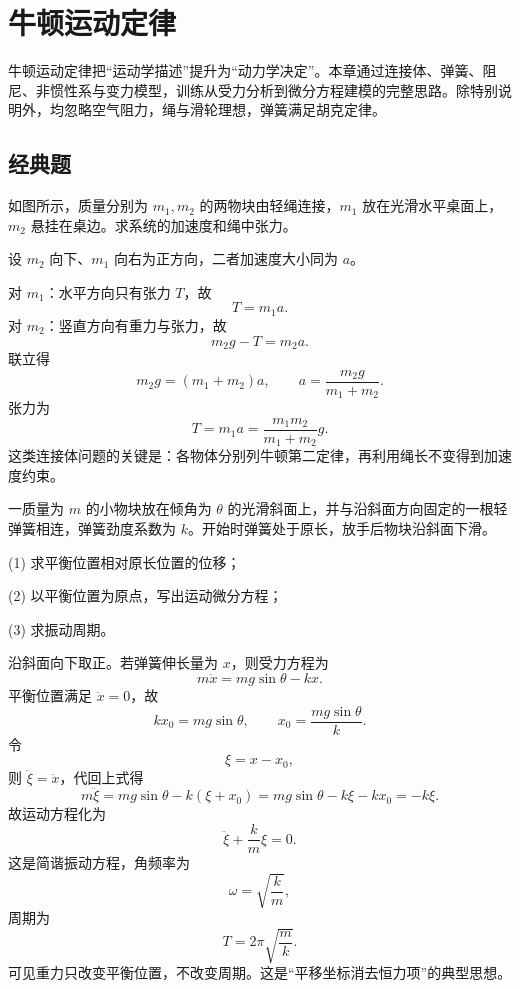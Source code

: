 \chapter{牛顿运动定律}

牛顿运动定律把“运动学描述”提升为“动力学决定”。本章通过连接体、弹簧、阻尼、非惯性系与变力模型，训练从受力分析到微分方程建模的完整思路。除特别说明外，均忽略空气阻力，绳与滑轮理想，弹簧满足胡克定律。

\section*{经典题}

\begin{classic}
如图所示，质量分别为 $m_1,m_2$ 的两物块由轻绳连接，$m_1$ 放在光滑水平桌面上，$m_2$ 悬挂在桌边。求系统的加速度和绳中张力。

\begin{center}
\end{center}

\begin{solution}
设 $m_2$ 向下、$m_1$ 向右为正方向，二者加速度大小同为 $a$。

对 $m_1$：水平方向只有张力 $T$，故
\[
T=m_1 a.
\]
对 $m_2$：竖直方向有重力与张力，故
\[
m_2 g-T=m_2 a.
\]
联立得
\[
m_2 g=(m_1+m_2)a,
\qquad
a=\frac{m_2 g}{m_1+m_2}.
\]
张力为
\[
T=m_1 a=\frac{m_1m_2}{m_1+m_2}g.
\]
这类连接体问题的关键是：各物体分别列牛顿第二定律，再利用绳长不变得到加速度约束。
\end{solution}
\end{classic}

\begin{classic}
一质量为 $m$ 的小物块放在倾角为 $\theta$ 的光滑斜面上，并与沿斜面方向固定的一根轻弹簧相连，弹簧劲度系数为 $k$。开始时弹簧处于原长，放手后物块沿斜面下滑。

(1) 求平衡位置相对原长位置的位移；

(2) 以平衡位置为原点，写出运动微分方程；

(3) 求振动周期。

\begin{solution}
沿斜面向下取正。若弹簧伸长量为 $x$，则受力方程为
\[
m\ddot x=mg\sin\theta-kx.
\]
平衡位置满足 $\ddot x=0$，故
\[
kx_0=mg\sin\theta,
\qquad
x_0=\frac{mg\sin\theta}{k}.
\]
令
\[
\xi=x-x_0,
\]
则 $\ddot\xi=\ddot x$，代回上式得
\[
m\ddot\xi=mg\sin\theta-k(\xi+x_0)=mg\sin\theta-k\xi-kx_0=-k\xi.
\]
故运动方程化为
\[
\ddot\xi+\frac{k}{m}\xi=0.
\]
这是简谐振动方程，角频率为
\[
\omega=\sqrt{\frac{k}{m}},
\]
周期为
\[
T=2\pi\sqrt{\frac{m}{k}}.
\]
可见重力只改变平衡位置，不改变周期。这是“平移坐标消去恒力项”的典型思想。
\end{solution}
\end{classic}

